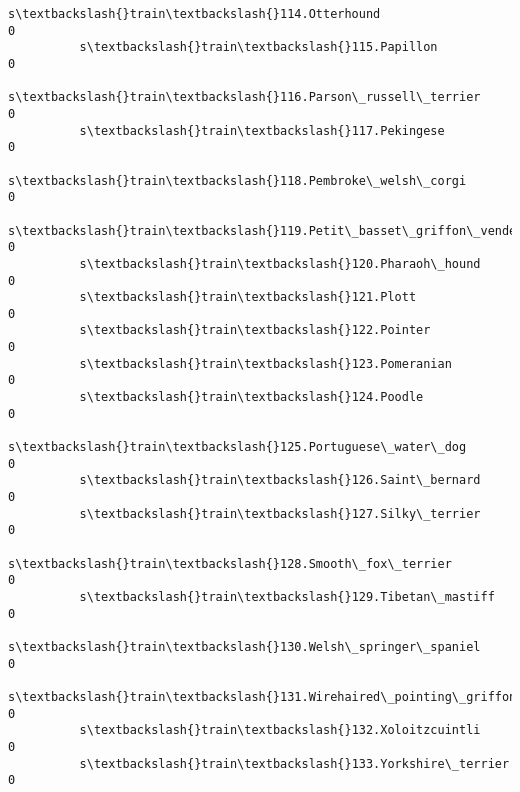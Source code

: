 \documentclass[11pt]{article}
\begin{document}
\begin{Verbatim}[commandchars=\\\{\}]
          s\textbackslash{}train\textbackslash{}114.Otterhound                                                           0   
          s\textbackslash{}train\textbackslash{}115.Papillon                                                             0   
          s\textbackslash{}train\textbackslash{}116.Parson\_russell\_terrier                                               0   
          s\textbackslash{}train\textbackslash{}117.Pekingese                                                            0   
          s\textbackslash{}train\textbackslash{}118.Pembroke\_welsh\_corgi                                                 0   
          s\textbackslash{}train\textbackslash{}119.Petit\_basset\_griffon\_vendeen                                         0   
          s\textbackslash{}train\textbackslash{}120.Pharaoh\_hound                                                        0   
          s\textbackslash{}train\textbackslash{}121.Plott                                                                0   
          s\textbackslash{}train\textbackslash{}122.Pointer                                                              0   
          s\textbackslash{}train\textbackslash{}123.Pomeranian                                                           0   
          s\textbackslash{}train\textbackslash{}124.Poodle                                                               0   
          s\textbackslash{}train\textbackslash{}125.Portuguese\_water\_dog                                                 0   
          s\textbackslash{}train\textbackslash{}126.Saint\_bernard                                                        0   
          s\textbackslash{}train\textbackslash{}127.Silky\_terrier                                                        0   
          s\textbackslash{}train\textbackslash{}128.Smooth\_fox\_terrier                                                   0   
          s\textbackslash{}train\textbackslash{}129.Tibetan\_mastiff                                                      0   
          s\textbackslash{}train\textbackslash{}130.Welsh\_springer\_spaniel                                               0   
          s\textbackslash{}train\textbackslash{}131.Wirehaired\_pointing\_griffon                                          0   
          s\textbackslash{}train\textbackslash{}132.Xoloitzcuintli                                                       0   
          s\textbackslash{}train\textbackslash{}133.Yorkshire\_terrier                                                    0   
          

\end{Verbatim}
\end{document}

